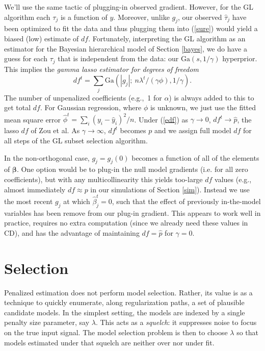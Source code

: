 \documentclass[12pt]{article}
\newcommand{\bs}[1]{\boldsymbol{#1}}
\newcommand{\mr}[1]{\mathrm{#1}}
\begin{document}
We'll use the same tactic of plugging-in observed gradient.  However, for the
GL algorithm each $\tau_j$ is a function of $y$.  Moreover, unlike $g_j$, our
observed $\hat\tau_j$ have been optimized to fit the data and thus  plugging
them into (\ref{sure}) would yield a biased (low) estimate of $df$. Fortunately,
interpreting the GL algorithm as an estimator for the Bayesian  hierarchical
model of Section \ref{bayes},  we do have a guess for each $\tau_j$ that is
independent from the data: our $\mr{Ga}(s,1/\gamma)$ hyperprior. This implies the
{\it gamma lasso estimator for degrees of freedom} \begin{equation}
\label{edf} df^t = \sum_j \mr{Ga}(|g_{j}|;~ n\lambda^t/(\gamma\phi),
1/\gamma). \end{equation}  The number of unpenalized coefficients (e.g.,~1 for
$\alpha$) is always added to this to get total $df$.  For Gaussian regression,
where $\phi$ is unknown, we just use the fitted mean square error $\hat\phi^t
= \sum_i (y_i - \hat y_i)^2/n$. Under (\ref{edf}) as $\gamma \rightarrow 0$,
$df^t \rightarrow \hat p$, the lasso $df$ of Zou et al. As $\gamma \rightarrow
\infty$, $df^t$ becomes $p$ and we assign full model $df$ for all steps of the
GL subset selection algorithm.


In the non-orthogonal case, $g_{j} = g_j(0)$ becomes a function of all of the
elements of $\bs{\beta}$.     One option would be to plug-in the null model
gradients (i.e. for all zero coefficients), but with any multicollinearity
this yields too-large $df$ values (e.g., almost immediately $df \approx p$ in
our simulations of Section \ref{sim}). Instead we use the most recent $g_j$ at
which $\hat\beta^t_j=0$, such that the effect of previously in-the-model
variables has been remove from our plug-in gradient.  This appears to work
well in practice, requires no extra computation (since we already need these
values in CD), and has the advantage of maintaining $df = \hat p$ for $\gamma = 0$.

\section{Selection}
\label{selection}


Penalized estimation does not perform model selection. Rather, its value is as
a technique to quickly enumerate,  along regularization paths, a set of
plausible candidate models.   In the simplest setting, the models are  indexed
by a single penalty size parameter, say $\lambda$. This acts as a {\it
squelch}: it suppresses noise to focus on the true input signal.  The model
selection problem is then to choose $\lambda$ so that models estimated under
that  squelch are neither over nor under fit.
\end{document}
